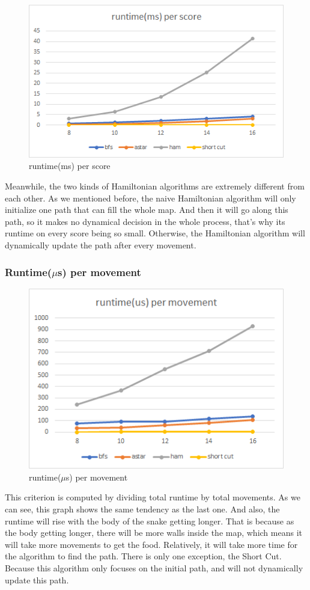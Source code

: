 \documentclass[12pt]{article}
\begin{document}
\begin{figure}[H]
    \centering 
    \includegraphics[scale = 0.9]{anay2.png}
    \caption{runtime(ms) per score}
\end{figure}

Meanwhile, the two kinds of Hamiltonian algorithms are extremely different from each other. As we mentioned before, the naive Hamiltonian algorithm will only initialize one path that can fill the whole map. And then it will go along this path, so it makes no dynamical decision in the whole process, that's why its runtime on every score being so small. Otherwise, the Hamiltonian algorithm will dynamically update the path after every movement. 

\subsubsection{Runtime($\mu$s) per movement}



\begin{figure}[H]
    \centering 
    \includegraphics[scale = 0.9]{anay3.png}
    \caption{runtime($\mu$s) per movement}
\end{figure}

This criterion is computed by dividing total runtime by total movements. As we can see, this graph shows the same tendency as the last one. And also, the runtime will rise with the body of the snake getting longer. That is because as the body getting longer, there will be more walls inside the map, which means it will take more movements to get the food. Relatively, it will take more time for the algorithm to find the path. There is only one exception, the Short Cut. Because this algorithm only focuses on the initial path, and will not dynamically update this path. 
\end{document}
